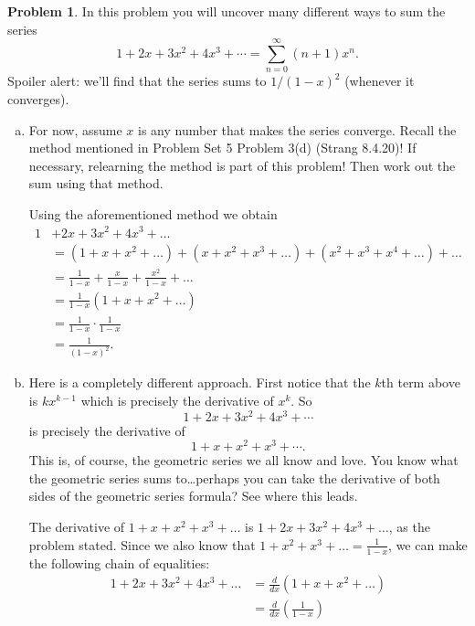 \documentclass[11pt,oneside]{amsart}
\theoremstyle{definition}
\newtheorem{problem}{Problem}
\theoremstyle{plain}
\begin{document}
    \begin{problem}
        In this problem you will uncover many different ways to sum the series
        \[1+2x+3x^2+4x^3+\cdots=\sum_{n=0}^\infty (n+1)x^n.\]
        Spoiler alert: we'll find that the series sums to $1/(1-x)^2$ (whenever it converges).
        \begin{enumerate}[(a)]
            \item For now, assume $x$ is any number that makes the series converge. Recall the method mentioned in Problem Set 5 Problem 3(d) (Strang 8.4.20)! If necessary, relearning the method is part of this problem! Then work out the sum using that method.
            \begin{solution}
                Using the aforementioned method we obtain
                \[\begin{split}
                    1&+2x+3x^2+4x^3+\dots\\
                    &= (1+x+x^2+\dots)+(x+x^2+x^3+\dots)+(x^2+x^3+x^4+\dots)+\dots\\
                    &= \frac 1{1-x}+\frac x{1-x}+\frac{x^2}{1-x}+\dots\\
                    &= \frac 1{1-x}(1+x+x^2+\dots)\\
                    &= \frac 1{1-x}\cdot\frac 1{1-x}\\
                    &= \frac 1{(1-x)^2}.
                \end{split}\]
            \end{solution}
            \item Here is a completely different approach. First notice that the $k$th term above is $kx^{k-1}$ which is precisely the derivative of $x^k$. So
            \[1+2x+3x^2+4x^3+\cdots\]
            is precisely the derivative of
            \[1+x+x^2+x^3+\cdots.\]
            This is, of course, the geometric series we all know and love. You know what the geometric series sums to\ldots perhaps you can take the derivative of both sides of the geometric series formula? See where this leads.
            \begin{solution}
                The derivative of $1+x+x^2+x^3+\dots$ is $1+2x+3x^2+4x^3+\dots$, as the problem stated. Since we also know that $1+x^2+x^3+\dots=\frac 1{1-x}$, we can make the following chain of equalities:
                \[\begin{split}
                    1+2x+3x^2+4x^3+\dots &= \frac d{dx}(1+x+x^2+\dots)\\
                    &= \frac d{dx}\left(\frac 1{1-x}\right)\\

\end{split}\]
\end{solution}
\end{enumerate}
\end{problem}
\end{document}
